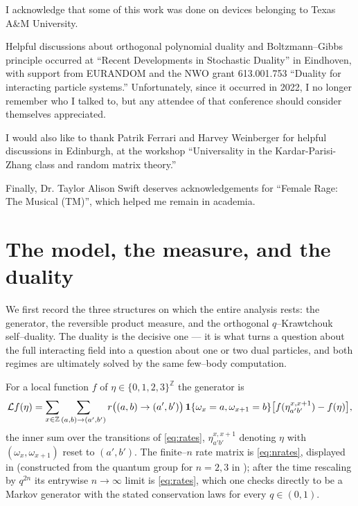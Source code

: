 \documentclass[11pt]{article}
\theoremstyle{plain}
\theoremstyle{definition}
\theoremstyle{remark}
\newcommand{\Z}{\mathbb{Z}}\newcommand{\R}{\mathbb{R}}\newcommand{\N}{\mathbb{N}}
\newcommand{\cL}{\mathcal L}\newcommand{\cO}{\mathcal O}\newcommand{\cE}{\mathcal E}
\begin{document}
I acknowledge that some of this work was done on devices belonging to Texas A\&M University.

Helpful discussions about orthogonal polynomial duality and Boltzmann–Gibbs principle occurred at ``Recent Developments in Stochastic Duality'' in Eindhoven, with support from EURANDOM and the NWO grant 613.001.753 ``Duality for interacting particle systems.'' Unfortunately, since it occurred in 2022, I no longer remember who I talked to, but any attendee of that conference should consider themselves appreciated.
 
I would also like to thank Patrik Ferrari and Harvey Weinberger for helpful discussions in Edinburgh, at the workshop ``Universality in the Kardar-Parisi-Zhang class and random matrix theory.''

Finally, Dr. Taylor Alison Swift deserves acknowledgements for ``Female Rage: The Musical (TM)'', which helped me remain in academia. 



\section{The model, the measure, and the duality}\label{sec:model}

We first record the three structures on which the entire analysis rests: the generator,
the reversible product measure, and the orthogonal $q$--Krawtchouk self--duality. The
duality is the decisive one --- it is what turns a question about the full interacting
field into a question about one or two dual particles, and both regimes are ultimately
solved by the same few--body computation.

For a local function $f$ of $\eta\in\{0,1,2,3\}^\Z$ the generator is
\begin{equation}\label{eq:gen}
  \cL f(\eta)=\sum_{x\in\Z}\sum_{(a,b)\to(a',b')}
   r\big((a,b)\to(a',b')\big)\,\bone\{\omega_x=a,\omega_{x+1}=b\}
   \big[f(\eta^{x,x+1}_{a'b'})-f(\eta)\big],
\end{equation}
the inner sum over the transitions of \eqref{eq:rates}, $\eta^{x,x+1}_{a'b'}$ denoting
$\eta$ with $(\omega_x,\omega_{x+1})$ reset to $(a',b')$. The finite--$n$ rate matrix
is \eqref{eq:nrates}, displayed in \cite[\S2.1]{REU} (constructed from the quantum
group for $n=2,3$ in \cite{KLLPZ}); after the time rescaling by $q^{2n}$ its entrywise
$n\to\infty$ limit is \eqref{eq:rates}, which one checks directly to be a Markov
generator with the stated conservation laws for every $q\in(0,1)$.
\end{document}
